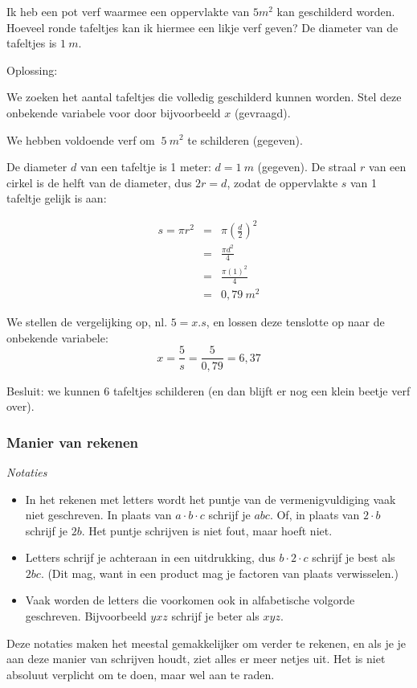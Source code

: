 \begin{voorbeeld}
Ik heb een pot verf waarmee een oppervlakte van $5m^2$
kan geschilderd worden. Hoeveel ronde tafeltjes kan ik hiermee een
likje verf geven? De diameter van de tafeltjes is $1~m$.

Oplossing: 

We zoeken het aantal tafeltjes die volledig geschilderd kunnen worden.
Stel deze onbekende variabele voor door bijvoorbeeld $x$ (gevraagd).

We hebben voldoende verf om $~5~m^2$ te schilderen (gegeven).

De diameter $d$ van een tafeltje is 1 meter: $d=1~m$ (gegeven). De straal $r$ van een cirkel is de helft van de diameter, dus $2r=d$, zodat de oppervlakte $s$ van 1 tafeltje gelijk is aan: 

\begin{eqnarray*}
s=\pi r^{2}&=&\pi\left(\frac{d}{2}\right)^{2}\\
&=&\frac{\pi d^{2}}{4}\\
&=&\frac{\pi(1)^{2}}{4}\\
&=&0,79~m^2
\end{eqnarray*}

We stellen de vergelijking op, nl. $5=x.s$, en lossen deze tenslotte op naar de onbekende variabele: 
\begin{equation*}
x=\frac{5}{s}=\frac{5}{0,79}=6,37
\end{equation*}

Besluit: we kunnen $6$ tafeltjes schilderen (en dan blijft er nog een
klein beetje verf over).

\end{voorbeeld}

\subsubsection{Manier van rekenen}

\emph{Notaties}

	\begin{itemize}
		\item In het rekenen met letters wordt het puntje van de vermenigvuldiging
		vaak niet geschreven. In plaats van $a\cdot b\cdot c$ schrijf je
		$abc$. Of, in plaats van $2\cdot b$ schrijf je $2b$. Het puntje
		schrijven is niet fout, maar hoeft niet.
		\item Letters schrijf je achteraan in een uitdrukking, dus $b\cdot2\cdot c$
		schrijf je best als $2bc$. (Dit mag, want in een product mag je factoren
		van plaats verwisselen.)
		\item Vaak worden de letters die voorkomen ook in alfabetische volgorde
		geschreven. Bijvoorbeeld $yxz$ schrijf je beter als $xyz$. 
	\end{itemize}
	Deze notaties maken het meestal gemakkelijker om verder
	te rekenen, en als je je aan deze manier van schrijven houdt, ziet
	alles er meer netjes uit. Het is niet absoluut verplicht om te doen,
	maar wel aan te raden.
	
